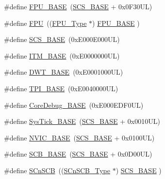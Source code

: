 \begin{DoxyCompactItemize}
\item 
\#define \hyperlink{group___c_m_s_i_s__core__base_ga4dcad4027118c098c07bcd575f1fbb28}{F\+P\+U\+\_\+\+B\+A\+SE}~(\hyperlink{group___c_m_s_i_s__core__base_ga3c14ed93192c8d9143322bbf77ebf770}{S\+C\+S\+\_\+\+B\+A\+SE} +  0x0\+F30\+U\+L)
\item 
\#define \hyperlink{group___c_m_s_i_s__core__base_gabc7c93f2594e85ece1e1a24f10591428}{F\+PU}~((\hyperlink{struct_f_p_u___type}{F\+P\+U\+\_\+\+Type}       $\ast$)     \hyperlink{group___c_m_s_i_s__core__base_ga4dcad4027118c098c07bcd575f1fbb28}{F\+P\+U\+\_\+\+B\+A\+SE}      )
\item 
\#define \hyperlink{group___c_m_s_i_s__core__base_ga3c14ed93192c8d9143322bbf77ebf770}{S\+C\+S\+\_\+\+B\+A\+SE}~(0x\+E000\+E000\+U\+L)
\item 
\#define \hyperlink{group___c_m_s_i_s__core__base_gadd76251e412a195ec0a8f47227a8359e}{I\+T\+M\+\_\+\+B\+A\+SE}~(0x\+E0000000\+U\+L)
\item 
\#define \hyperlink{group___c_m_s_i_s__core__base_gafdab534f961bf8935eb456cb7700dcd2}{D\+W\+T\+\_\+\+B\+A\+SE}~(0x\+E0001000\+U\+L)
\item 
\#define \hyperlink{group___c_m_s_i_s__core__base_ga2b1eeff850a7e418844ca847145a1a68}{T\+P\+I\+\_\+\+B\+A\+SE}~(0x\+E0040000\+U\+L)
\item 
\#define \hyperlink{group___c_m_s_i_s__core__base_ga680604dbcda9e9b31a1639fcffe5230b}{Core\+Debug\+\_\+\+B\+A\+SE}~(0x\+E000\+E\+D\+F0\+U\+L)
\item 
\#define \hyperlink{group___c_m_s_i_s__core__base_ga58effaac0b93006b756d33209e814646}{Sys\+Tick\+\_\+\+B\+A\+SE}~(\hyperlink{group___c_m_s_i_s__core__base_ga3c14ed93192c8d9143322bbf77ebf770}{S\+C\+S\+\_\+\+B\+A\+SE} +  0x0010\+U\+L)
\item 
\#define \hyperlink{group___c_m_s_i_s__core__base_gaa0288691785a5f868238e0468b39523d}{N\+V\+I\+C\+\_\+\+B\+A\+SE}~(\hyperlink{group___c_m_s_i_s__core__base_ga3c14ed93192c8d9143322bbf77ebf770}{S\+C\+S\+\_\+\+B\+A\+SE} +  0x0100\+U\+L)
\item 
\#define \hyperlink{group___c_m_s_i_s__core__base_gad55a7ddb8d4b2398b0c1cfec76c0d9fd}{S\+C\+B\+\_\+\+B\+A\+SE}~(\hyperlink{group___c_m_s_i_s__core__base_ga3c14ed93192c8d9143322bbf77ebf770}{S\+C\+S\+\_\+\+B\+A\+SE} +  0x0\+D00\+U\+L)
\item 
\#define \hyperlink{group___c_m_s_i_s__core__base_ga9fe0cd2eef83a8adad94490d9ecca63f}{S\+Cn\+S\+CB}~((\hyperlink{struct_s_cn_s_c_b___type}{S\+Cn\+S\+C\+B\+\_\+\+Type}    $\ast$)     \hyperlink{group___c_m_s_i_s__core__base_ga3c14ed93192c8d9143322bbf77ebf770}{S\+C\+S\+\_\+\+B\+A\+SE}      )

\end{DoxyCompactItemize}
